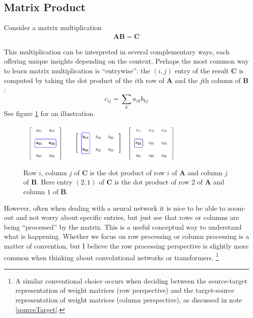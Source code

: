 \subsection{Matrix Product}




Consider a matrix multiplication 
\begin{align*}
\mathbf{A}\mathbf{B} = \mathbf{C}
\end{align*}

This multiplication can be interpreted in several complementary ways, each offering unique insights depending on the context. Perhaps the most common way to learn matrix multiplication is ``entrywise'': the $(i,j)$ entry of the result $\mathbf{C}$ is computed by taking the dot product of the $i$th row of $\mathbf{A}$ and the $j$th column of $\mathbf{B}$:
\[
c_{ij} = \sum_k a_{ik} b_{kj}
\]
See figure \ref{entryWiseMatrixProduct} for an illustration. 

\begin{figure}[h]
\centering
\includegraphics[width=0.75\textwidth]{images/matrixProductEntryWise.png}
\caption[Jeff Yoshimi.]{Row $i$, column $j$ of $\mathbf{C}$ is the dot product of row $i$ of $\mathbf{A}$ and column $j$ of $\mathbf{B}$. Here entry $(2,1)$ of $\mathbf{C}$ is the dot product of row $2$ of $\mathbf{A}$ and column $1$ of $\mathbf{B}$.}
\label{entryWiseMatrixProduct}
\end{figure}

However, often when dealing with a neural network it is nice to be able to  zoom-out and not worry about specific entries, but just see that rows or columns are being ``processed'' by the matrix. This is a useful conceptual way to understand what is happening. Whether we focus on row processing or column processing is a matter of convention, but I believe the row processing perspective is slightly more common when thinking about convolutional networks or transformers. \footnote{A similar conventional choice occurs when deciding between  the source-target representation of weight matrices (row perspective) and the target-source representation of weight matrices (column perspective), as discussed in note \ref{sourceTarget}.}

